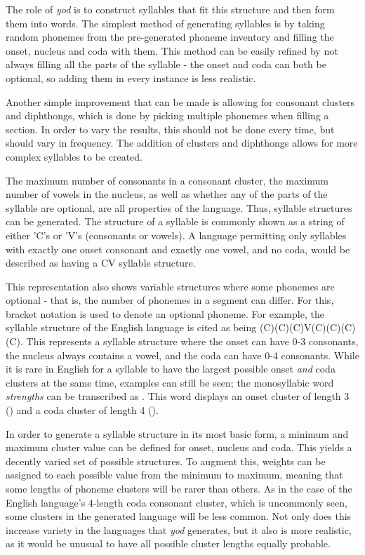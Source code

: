 \documentclass{report}
\begin{document}
	The role of \textit{yod} is to construct syllables that fit this structure and then form them into words. The simplest method of generating syllables is by taking random phonemes from the pre-generated phoneme inventory and filling the onset, nucleus and coda with them. This method can be easily refined by not always filling all the parts of the syllable - the onset and coda can both be optional, so adding them in every instance is less realistic.
	
	Another simple improvement that can be made is allowing for consonant clusters and diphthongs, which is done by picking multiple phonemes when filling a section. In order to vary the results, this should not be done every time, but should vary in frequency. The addition of clusters and diphthongs allows for more complex syllables to be created.
	
	The maximum number of consonants in a consonant cluster, the maximum number of vowels in the nucleus, as well as whether any of the parts of the syllable are optional, are all properties of the language. Thus, syllable structures can be generated. The structure of a syllable is commonly shown as a string of either 'C's or 'V's (consonants or vowels)\cite{clements1985cv}. A language permitting only syllables with exactly one onset consonant and exactly one vowel, and no coda, would be described as having a CV syllable structure.
	
	This representation also shows variable structures where some phonemes are optional - that is, the number of phonemes in a segment can differ. For this, bracket notation is used to denote an optional phoneme. For example, the syllable structure of the English language is cited as being (C)(C)(C)V(C)(C)(C)(C). This represents a syllable structure where the onset can have 0-3 consonants, the nucleus always contains a vowel, and the coda can have 0-4 consonants. While it is rare in English for a syllable to have the largest possible onset \textit{and} coda clusters at the same time, examples can still be seen; the monosyllabic word \textit{strengths} can be transcribed as . This word displays an onset cluster of length 3 () and a coda cluster of length 4 ().
	
	In order to generate a syllable structure in its most basic form, a minimum and maximum cluster value can be defined for onset, nucleus and coda. This yields a decently varied set of possible structures. To augment this, weights can be assigned to each possible value from the minimum to maximum, meaning that some lengths of phoneme clusters will be rarer than others. As in the case of the English language's 4-length coda consonant cluster, which is uncommonly seen, some clusters in the generated language will be less common. Not only does this increase variety in the languages that \textit{yod} generates, but it also is more realistic, as it would be unusual to have all possible cluster lengths equally probable.
	
\end{document}
